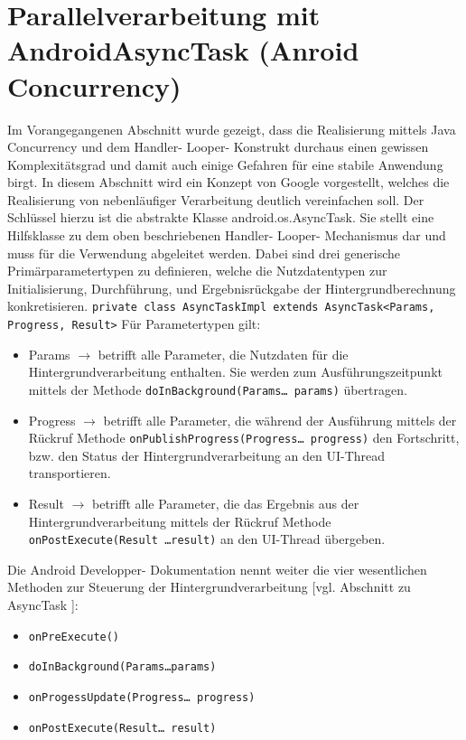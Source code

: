 \documentclass[12pt,oneside,a4paper,bibtotoc,liststotoc]{scrreprt}
\begin{document}
\section{Parallelverarbeitung mit AndroidAsyncTask (Anroid Concurrency)}
Im Vorangegangenen Abschnitt wurde gezeigt, dass die Realisierung mittels Java Concurrency und dem Handler- Looper- Konstrukt durchaus einen gewissen Komplexitätsgrad und damit auch einige Gefahren für eine stabile Anwendung birgt. In diesem Abschnitt wird ein Konzept von Google vorgestellt, welches die Realisierung von nebenläufiger Verarbeitung deutlich vereinfachen soll. Der Schlüssel hierzu ist die abstrakte Klasse android.os.AsyncTask. Sie stellt eine Hilfsklasse zu dem oben beschriebenen Handler- Looper- Mechanismus dar und muss für die Verwendung abgeleitet werden. Dabei sind drei generische Primärparametertypen zu definieren, welche die  Nutzdatentypen zur Initialisierung, Durchführung, und Ergebnisrückgabe der Hintergrundberechnung konkretisieren.\newline
\newline
\texttt{private class AsyncTaskImpl extends AsyncTask<Params, Progress, Result>}
\newline
Für Parametertypen gilt:
\begin{itemize}
\item Params $\rightarrow$ betrifft alle Parameter, die Nutzdaten für die Hintergrundverarbeitung enthalten. Sie werden zum Ausführungszeitpunkt mittels der Methode \texttt{doInBackground(Params… params)} übertragen.
\item Progress $\rightarrow$ betrifft alle Parameter, die während der Ausführung mittels der Rückruf Methode \texttt{onPublishProgress(Progress… progress)} den Fortschritt, bzw.  den Status der Hintergrundverarbeitung an den UI-Thread transportieren.
\item Result $\rightarrow$ betrifft alle Parameter, die das Ergebnis aus der Hintergrundverarbeitung mittels der Rückruf Methode \texttt{onPostExecute(Result …result)} an den UI-Thread übergeben.
\end{itemize}
Die Android Developper- Dokumentation nennt weiter die vier wesentlichen Methoden zur Steuerung der Hintergrundverarbeitung [vgl. Abschnitt zu AsyncTask \citet{androidDevDocu}]:
\begin{itemize}
\item \texttt{onPreExecute()}
\item \texttt{doInBackground(Params…params)}
\item \texttt{onProgessUpdate(Progress… progress)}
\item \texttt{onPostExecute(Result… result)}
\end{itemize}
\end{document}

